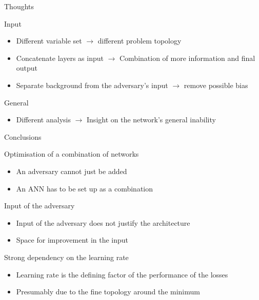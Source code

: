 \begin{frame}{Thoughts}
    \begin{block}{Input}
        \begin{itemize}
            \item Different variable set $\rightarrow$ different problem topology
            \item Concatenate layers as input $\rightarrow$ Combination of more information and final output
            \item Separate background from the adversary's input $\rightarrow$ remove possible bias
        \end{itemize}
    \end{block}
    \begin{block}{General}
        \begin{itemize}
            \item Different analysis $\rightarrow$ Insight on the network's general inability
        \end{itemize}
    \end{block}
\end{frame}

\begin{frame}{Conclusions}
    \begin{block}{Optimisation of a combination of networks}
        \begin{itemize}
            \item An adversary cannot just be added
            \item An ANN has to be set up as a combination
        \end{itemize}
    \end{block}
    \begin{block}{Input of the adversary}
        \begin{itemize}
            \item Input of the adversary does not justify the architecture
            \item Space for improvement in the input
        \end{itemize}
    \end{block}
    \begin{block}{Strong dependency on the learning rate}
        \begin{itemize}
            \item Learning rate is the defining factor of the performance of the losses
            \item Presumably due to the fine topology around the minimum
        \end{itemize}
    \end{block}
\end{frame}


